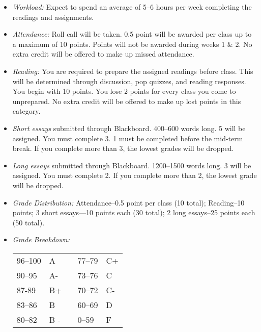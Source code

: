 \documentclass[article,oneside]{memoir}
\begin{document}
\begin{itemize}
\item \textit{Workload:} Expect to spend an average of 5--6 hours per week  completing the readings and assignments.

\item \textit{Attendance:} Roll call will be taken. 0.5 point will be awarded per class up to a maximum of 10 points. Points will not be awarded during weeks 1 \& 2. No extra credit will be offered to make up missed attendance.
\item \textit{Reading:} You are required to prepare the assigned readings before class. This will be determined through discussion, pop quizzes, and reading responses. You begin with 10 points. You lose 2 points for every class you come to unprepared. No extra credit will be offered to make up lost points in this category. 

\item \textit{Short essays} submitted through Blackboard. 400--600 words long. 5 will be assigned. You must complete 3. 1 must be completed before the mid-term break. If you complete more than 3, the lowest grades will be dropped.

 
\item \textit{Long essays} submitted through Blackboard. 1200--1500 words long. 3 will be assigned. You must complete 2. If you complete more than 2, the lowest grade will be dropped.


\item \textit{Grade Distribution:} Attendance--0.5 point per class (10 total); Reading--10 points; 3 short essays---10 points each (30 total); 2 long essays--25 points each (50 total).

\item \textit{Grade Breakdown:}

 \begin{tabular}{ | l | l | p{2cm} | l | l | }
    \hline 
96--100 & A  & &  77--79 &  C+ \\  
90--95 & A- & &  73--76 & C \\
87-89 & B+ &  &  70--72 & C- \\ 
83--86 & B  & &  60--69 & D\\
80--82 & B - & & 0--59 & F\\ \hline
    \end{tabular}


\end{itemize}
\end{document}
